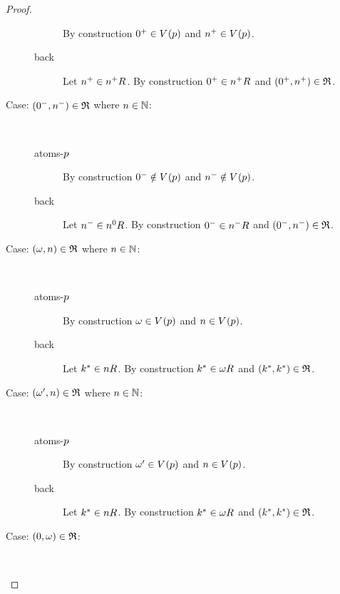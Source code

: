 \begin{proof}
\begin{description}
\begin{description}
                By construction $0^+ \in \kValuation(\atomP)$ and $n^+ \in \kValuation(\atomP)$.
            \item[back]
                Let $n^+ \in \kSuccessors{}{n^+}$.
                By construction $0^+ \in \kSuccessors{}{n^+}$ and $(0^+, n^+) \in \mathfrak{R}$.
        \end{description}
    \item[Case: $(0^-, n^-) \in \mathfrak{R}$ where $n \in \mathbb{N}$:]\hfill\\
        \begin{description}
            \item[atoms-$p$]
                By construction $0^- \notin \kValuation(\atomP)$ and $n^- \notin \kValuation(\atomP)$.
            \item[back]
                Let $n^- \in \kSuccessors{}{n^0}$.
                By construction $0^- \in \kSuccessors{}{n^-}$ and $(0^-, n^-) \in \mathfrak{R}$.
        \end{description}
    \item[Case: $(\omega, n) \in \mathfrak{R}$ where $n \in \mathbb{N}$:]\hfill\\
        \begin{description}
            \item[atoms-$p$]
                By construction $\omega \in \kValuation(\atomP)$ and $n \in \kValuation(\atomP)$.
            \item[back]
                Let $k^* \in \kSuccessors{}{n}$.
                By construction $k^* \in \kSuccessors{}{\omega}$ and $(k^*, k^*) \in \mathfrak{R}$.
        \end{description}
    \item[Case: $(\omega', n) \in \mathfrak{R}$ where $n \in \mathbb{N}$:]\hfill\\
        \begin{description}
            \item[atoms-$p$]
                By construction $\omega' \in \kValuation(\atomP)$ and $n \in \kValuation(\atomP)$.
            \item[back]
                Let $k^* \in \kSuccessors{}{n}$.
                By construction $k^* \in \kSuccessors{}{\omega}$ and $(k^*, k^*) \in \mathfrak{R}$.
        \end{description}
    \item[Case: $(0, \omega) \in \mathfrak{R}$:]\hfill\\
        \begin{description}

\end{description}
\end{description}
\end{proof}
